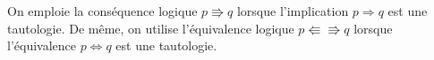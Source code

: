     On emploie la conséquence logique $p \Rrightarrow q$ lorsque l'implication $p \Rightarrow q$ est une tautologie.
    De même, on utilise l'équivalence logique $p \Lleftarrow \Rrightarrow q$ lorsque l'équivalence $p \Leftrightarrow q$ est une tautologie.
%
%
%
%
%
%
%
%
